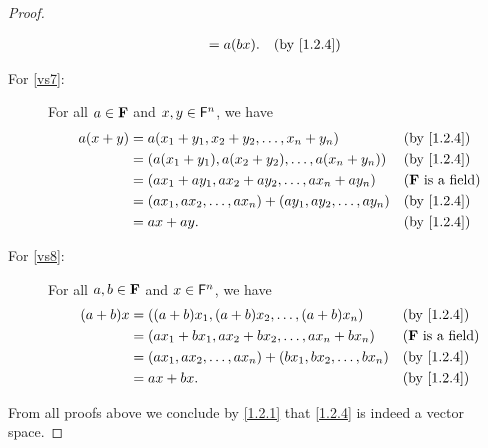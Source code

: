 \begin{proof}
\begin{description}
\begin{align*}
                         & = a \p{bx}.                                              &  & \text{(by \cref{1.2.4})}
            \end{align*}
        \item[For \ref{vs7}:]
            For all \(a \in \mathbf{F}\) and \(x, y \in \mathsf{F}^{n}\), we have
            \begin{align*}
                a \p{x + y} & = a \p{x_{1} + y_{1}, x_{2} + y_{2}, \dots, x_{n} + y_{n}}                    &  & \text{(by \cref{1.2.4})}   \\
                            & = \p{a \p{x_{1} + y_{1}}, a \p{x_{2} + y_{2}}, \dots, a \p{x_{n} + y_{n}}}    &  & \text{(by \cref{1.2.4})}   \\
                            & = \p{a x_{1} + a y_{1}, a x_{2} + a y_{2}, \dots, a x_{n} + a y_{n}}          &  & \text{(\(\F\) is a field)} \\
                            & = \p{a x_{1}, a x_{2}, \dots, a x_{n}} + \p{a y_{1}, a y_{2}, \dots, a y_{n}} &  & \text{(by \cref{1.2.4})}   \\
                            & = a x + a y.                                                                  &  & \text{(by \cref{1.2.4})}
            \end{align*}
        \item[For \ref{vs8}:]
            For all \(a, b \in \mathbf{F}\) and \(x \in \mathsf{F}^{n}\), we have
            \begin{align*}
                \p{a + b} x & = \p{\p{a + b} x_{1}, \p{a + b} x_{2}, \dots, \p{a + b} x_{n}}                &  & \text{(by \cref{1.2.4})}   \\
                            & = \p{a x_{1} + b x_{1}, a x_{2} + b x_{2}, \dots, a x_{n} + b x_{n}}          &  & \text{(\(\F\) is a field)} \\
                            & = \p{a x_{1}, a x_{2}, \dots, a x_{n}} + \p{b x_{1}, b x_{2}, \dots, b x_{n}} &  & \text{(by \cref{1.2.4})}   \\
                            & = a x + b x.                                                                  &  & \text{(by \cref{1.2.4})}
            \end{align*}
    \end{description}
    From all proofs above we conclude by \cref{1.2.1} that \cref{1.2.4} is indeed a vector space.
\end{proof}
